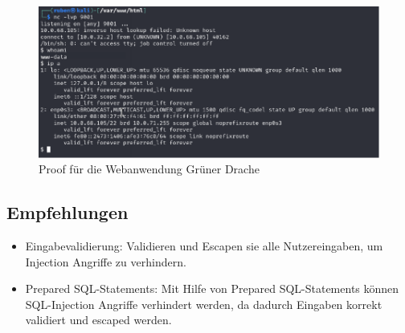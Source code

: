 \begin{figure}[!ht]
    \centering
    \includegraphics[width=\linewidth]{images/proofs/02_gruener_drache_proof.png}
    \caption{Proof für die Webanwendung Grüner Drache}
    \label{fig:02_gruener_drache_proof}
\end{figure}

\subsection*{Empfehlungen} 
\begin{itemize}
    \item Eingabevalidierung: Validieren und Escapen sie alle Nutzereingaben, um Injection Angriffe zu verhindern.
    \item Prepared SQL-Statements: Mit Hilfe von Prepared SQL-Statements können SQL-Injection Angriffe verhindert werden, da dadurch Eingaben korrekt validiert und escaped werden.
\end{itemize}

